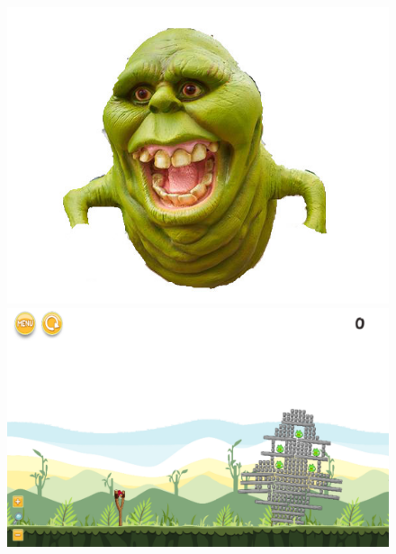 \documentclass{dalthesis}
\begin{document}
\begin{figure}
  \includegraphics[width=\textwidth,height=\textheight,keepaspectratio]{levels/pictures/halloween/grime.jpg}
  \includegraphics[width=\textwidth,height=\textheight,keepaspectratio]{levels/screenshots/halloween/grime.png}
\end{figure}
\end{document}
